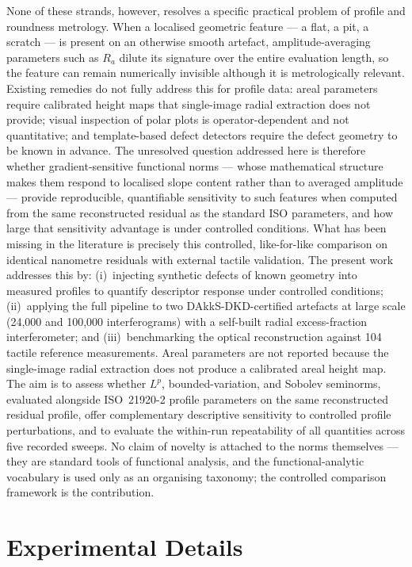 \documentclass[review]{elsarticle}
\begin{document}
None of these strands, however, resolves a specific practical problem of profile and roundness metrology. When a localised geometric feature — a flat, a pit, a scratch — is present on an otherwise smooth artefact, amplitude-averaging parameters such as $R_a$ dilute its signature over the entire evaluation length, so the feature can remain numerically invisible although it is metrologically relevant. Existing remedies do not fully address this for profile data: areal parameters require calibrated height maps that single-image radial extraction does not provide; visual inspection of polar plots is operator-dependent and not quantitative; and template-based defect detectors require the defect geometry to be known in advance. The unresolved question addressed here is therefore whether gradient-sensitive functional norms — whose mathematical structure makes them respond to localised slope content rather than to averaged amplitude — provide reproducible, quantifiable sensitivity to such features when computed from the same reconstructed residual as the standard ISO parameters, and how large that sensitivity advantage is under controlled conditions. What has been missing in the literature is precisely this controlled, like-for-like comparison on identical nanometre residuals with external tactile validation. The present work addresses this by: (i)~injecting synthetic defects of known geometry into measured profiles to quantify descriptor response under controlled conditions; (ii)~applying the full pipeline to two DAkkS-DKD-certified artefacts at large scale (24,000 and 100,000 interferograms) with a self-built radial excess-fraction interferometer; and (iii)~benchmarking the optical reconstruction against 104 tactile reference measurements. Areal parameters are not reported because the single-image radial extraction does not produce a calibrated areal height map. The aim is to assess whether $L^p$, bounded-variation, and Sobolev seminorms, evaluated alongside ISO~21920-2 profile parameters on the same reconstructed residual profile, offer complementary descriptive sensitivity to controlled profile perturbations, and to evaluate the within-run repeatability of all quantities across five recorded sweeps. No claim of novelty is attached to the norms themselves — they are standard tools of functional analysis, and the functional-analytic vocabulary is used only as an organising taxonomy; the controlled comparison framework is the contribution.

\section{Experimental Details}
\end{document}
